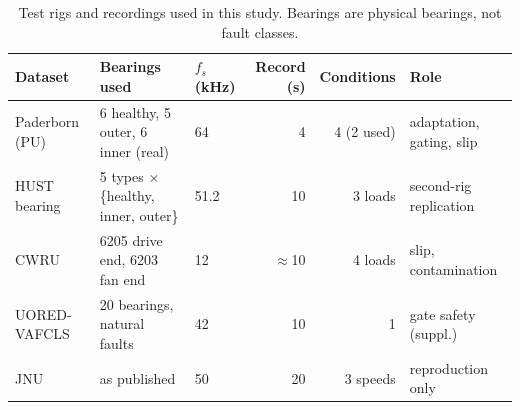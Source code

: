 \begin{table}[htbp]
\centering
\caption{Test rigs and recordings used in this study. Bearings are physical bearings, not fault classes.}
\label{tab:datasets}
\small
\setlength{\tabcolsep}{4pt}
\begin{tabular}{lllrrl}
\toprule
Dataset & Bearings used & $f_s$ (kHz) & Record (s) & Conditions & Role \\
\midrule
Paderborn (PU) \cite{lessmeier2016} & 6 healthy, 5 outer, 6 inner (real) & 64 & 4 & 4 (2 used) & adaptation, gating, slip \\
HUST bearing \cite{thuan2023hust} & 5 types $\times$ \{healthy, inner, outer\} & 51.2 & 10 & 3 loads & second-rig replication \\
CWRU \cite{smith2015} & 6205 drive end, 6203 fan end & 12 & $\approx$10 & 4 loads & slip, contamination \\
UORED-VAFCLS \cite{sehri2023uored} & 20 bearings, natural faults & 42 & 10 & 1 & gate safety (suppl.) \\
JNU \cite{li2013jnu} & as published & 50 & 20 & 3 speeds & reproduction only \\
\bottomrule
\end{tabular}
\end{table}
